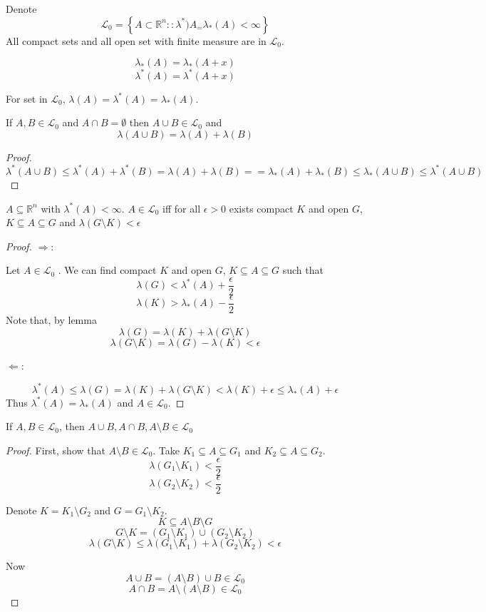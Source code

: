 Denote $$\mathcal{L}_0 = \left\{ A\subset\mathbb{R}^n :: \lambda^*)A_=\lambda_*(A) < \infty  \right\}$$
All compact sets and all open set with finite measure are in $\mathcal{L}_0$.
\begin{prop}
	$$\lambda_*(A) = \lambda_*(A+x)$$
	$$\lambda^*(A) = \lambda^*(A+x)$$
\end{prop}

\begin{definition}
	For set in $\mathcal{L}_0$, $\lambda(A)=\lambda^*(A)=\lambda_*(A)$.
\end{definition}
\begin{lemma}
	If $A,B \in \mathcal{L}_0$ and $A\cap B = \emptyset$ then $A\cup B \in \mathcal{L}_0$ and 
	$$\lambda(A\cup B) = \lambda(A)+\lambda(B)$$
\end{lemma}
\begin{proof}
	$$\lambda^*(A\cup B) \leq \lambda^*(A)+ \lambda^*(B) = \lambda(A) + \lambda(B) = = \lambda_*(A) + \lambda_*(B) \leq \lambda_*(A\cup B)  \leq \lambda^*(A\cup B) $$
\end{proof}
\begin{theorem}
	$A\subseteq \mathbb{R}^n$ with $\lambda^*(A)<\infty$. $A \in \mathcal{L}_0$ iff for all $\epsilon > 0 $ exists compact $K$ and open $G$, $K\subseteq A \subseteq G$ and $\lambda(G\setminus K) < \epsilon$
	
	
	\begin{proof}
		$\Rightarrow$:
		
		Let  $A \in \mathcal{L}_0$ . We can find compact $K$ and open $G$, $K\subseteq A \subseteq G$ such that
		$$\lambda(G) < \lambda^*(A) +\frac{\epsilon}{2}$$
		$$\lambda(K) > \lambda_*(A) - \frac{\epsilon}{2}$$
		Note that, by lemma
		$$\lambda(G) = \lambda(K) + \lambda(G\setminus K)$$
		$$\lambda(G\setminus K) = \lambda(G) -\lambda(K) < \epsilon$$
		
		
		$\Leftarrow$:
		
		$$\lambda^*(A) \leq \lambda(G) = \lambda(K) + \lambda(G\setminus K) <\lambda(K)+\epsilon \leq \lambda_*(A) +\epsilon $$
		Thus $\lambda^*(A)  = \lambda_*(A) $ and $A \in \mathcal{L}_0$.
	\end{proof}
\begin{coll}
	If $A,B\in \mathcal{L}_0$, then $A\cup B, A\cap B, A\setminus B  \in \mathcal{L}_0$
	\begin{proof}
		First, show that $A\setminus B \in \mathcal{L}_0$.
		Take $K_1\subseteq A\subseteq G_1$ and $K_2 \subseteq A\subseteq G_2$.
		$$\lambda(G_1\setminus K_1) < \frac{\epsilon}{2}$$
		$$\lambda(G_2\setminus K_2) < \frac{\epsilon}{2}$$
		
		Denote $K = K_1\setminus G_2$ and $G = G_1 \setminus K_2$.
		$$K\subseteq A\setminus B \setminus G$$
		$$G\setminus K = (G_1\setminus K_1) \cup (G_2\setminus K_2)$$
		$$\lambda(G\setminus K)  \leq \lambda(G_1\setminus K_1) + \lambda(G_2\setminus K_2) < \epsilon$$
		
		Now
		$$A\cup B = (A\setminus B) \cup B \in \mathcal{L}_0$$
		$$A\cap B = A\setminus (A\setminus B)   \in \mathcal{L}_0$$
	\end{proof}
\end{coll}
\end{theorem}

